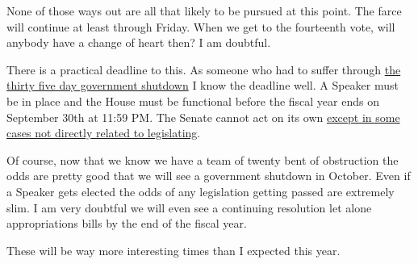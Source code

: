 None of those ways out are all that likely to be pursued at this point.
The farce will continue at least through Friday. When we get to the
fourteenth vote, will anybody have a change of heart then? I am
doubtful.

There is a practical deadline to this. As someone who had to suffer
through \href{https://www.gao.gov/products/gao-20-377}{the thirty five
day government shutdown} I know the deadline well. A Speaker must be in
place and the House must be functional before the fiscal year ends on
September 30th at 11:59 PM. The Senate cannot act on its own
\href{https://www.senate.gov/about/powers-procedures.htm}{except in some
cases not directly related to legislating}.

Of course, now that we know we have a team of twenty bent of obstruction
the odds are pretty good that we will see a government shutdown in
October. Even if a Speaker gets elected the odds of any legislation
getting passed are extremely slim. I am very doubtful we will even see a
continuing resolution let alone appropriations bills by the end of the
fiscal year.

These will be way more interesting times than I expected this year.
